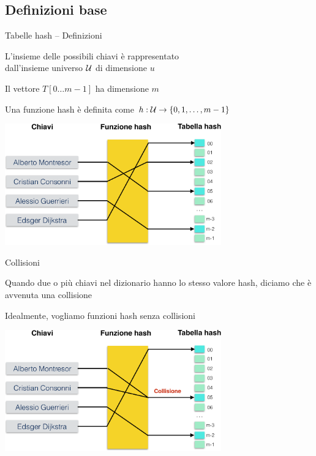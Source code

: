 \subsection{Definizioni base}

\begin{frame}{Tabelle hash -- Definizioni}

\vspace{-6pt}
\BI
\item L'insieme delle possibili chiavi è rappresentato \\dall'\alert{insieme universo} $\cal U$
di dimensione $u$
\item Il vettore $T[0 \ldots m-1]$ ha dimensione $m$
\item Una funzione hash è definita come
\(
h: {\cal U} \rightarrow \{ 0, 1, \ldots, m-1 \}
\)
\EI	
\begin{center}
\includegraphics[width=0.7\textwidth]{hash-crop.pdf}
\end{center}

\end{frame}

\begin{frame}{Collisioni}

\vspace{-6pt}
\BI
\item Quando due o più chiavi nel dizionario hanno lo stesso valore hash, 
diciamo che è avvenuta una \alert{collisione}
\item Idealmente, vogliamo funzioni hash senza collisioni
\EI
\begin{center}
\includegraphics[width=0.7\textwidth]{collisioni-crop.pdf}
\end{center}

\end{frame}

